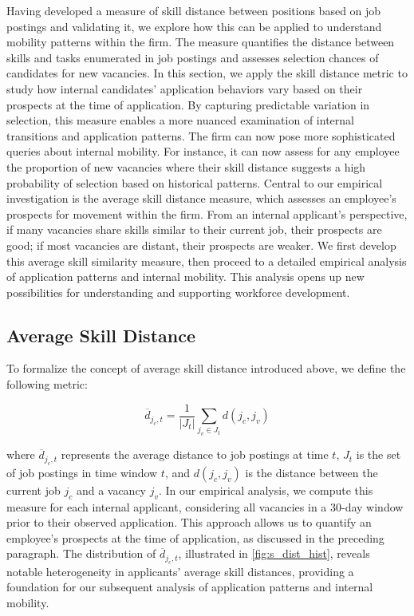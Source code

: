 \documentclass[12pt]{article}
\begin{document}
Having developed a measure of skill distance between positions based on job postings and validating it, we explore how this can be applied to understand mobility patterns within the firm. The measure quantifies the distance between skills and tasks enumerated in job postings and assesses selection chances of candidates for new vacancies. In this section, we apply the skill distance metric to study how internal candidates' application behaviors vary based on their prospects at the time of application. By capturing predictable variation in selection, this measure enables a more nuanced examination of internal transitions and application patterns. The firm can now pose more sophisticated queries about internal mobility. For instance, it can now assess for any employee the proportion of new vacancies where their skill distance suggests a high probability of selection based on historical patterns. Central to our empirical investigation is the average skill distance measure, which assesses an employee's prospects for movement within the firm. From an internal applicant's perspective, if many vacancies share skills similar to their current job, their prospects are good; if most vacancies are distant, their prospects are weaker. We first develop this average skill similarity measure, then proceed to a detailed empirical analysis of application patterns and internal mobility. This analysis opens up new possibilities for understanding and supporting workforce development.




\subsection{Average Skill Distance}

To formalize the concept of average skill distance introduced above, we define the following metric:

\begin{equation}
    \overline{d}_{j_c, t} = \frac{1}{|J_t|} \sum_{j_v \in J_t} d(j_c, j_v)
\end{equation}

where $\overline{d}_{j_c, t}$ represents the average distance to job postings at time $t$, $J_t$ is the set of job postings in time window $t$, and $d(j_c, j_v)$ is the distance between the current job $j_c$ and a vacancy $j_v$. In our empirical analysis, we compute this measure for each internal applicant, considering all vacancies in a 30-day window prior to their observed application. This approach allows us to quantify an employee's prospects at the time of application, as discussed in the preceding paragraph. The distribution of $\overline{d}_{j_c, t}$, illustrated in \autoref{fig:s_dist_hist}, reveals notable heterogeneity in applicants' average skill distances, providing a foundation for our subsequent analysis of application patterns and internal mobility.
\end{document}
